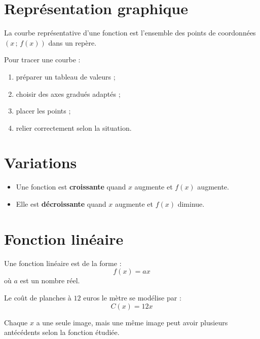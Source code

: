 \documentclass[11pt,a4paper,twoside]{book}
\begin{document}
\section{Représentation graphique}
\begin{definitionbox}
La courbe représentative d'une fonction est l'ensemble des points
de coordonnées \((x\,;\,f(x))\) dans un repère.
\end{definitionbox}

\begin{methodebox}
Pour tracer une courbe :
\begin{enumerate}
\item préparer un tableau de valeurs ;
\item choisir des axes gradués adaptés ;
\item placer les points ;
\item relier correctement selon la situation.
\end{enumerate}
\end{methodebox}

\section{Variations}
\begin{definitionbox}
\begin{itemize}
\item Une fonction est \textbf{croissante} quand \(x\) augmente et \(f(x)\) augmente.
\item Elle est \textbf{décroissante} quand \(x\) augmente et \(f(x)\) diminue.
\end{itemize}
\end{definitionbox}

\section{Fonction linéaire}
\begin{definitionbox}
Une fonction linéaire est de la forme :
\[
f(x)=ax
\]
où \(a\) est un nombre réel.
\end{definitionbox}

\begin{exemplebox}
Le coût de planches à \(12\) euros le mètre se modélise par :
\[
C(x)=12x
\]
\end{exemplebox}

\begin{attentionbox}
Chaque \(x\) a une seule image, mais une même image peut avoir plusieurs antécédents selon la fonction étudiée.
\end{attentionbox}
\end{document}
